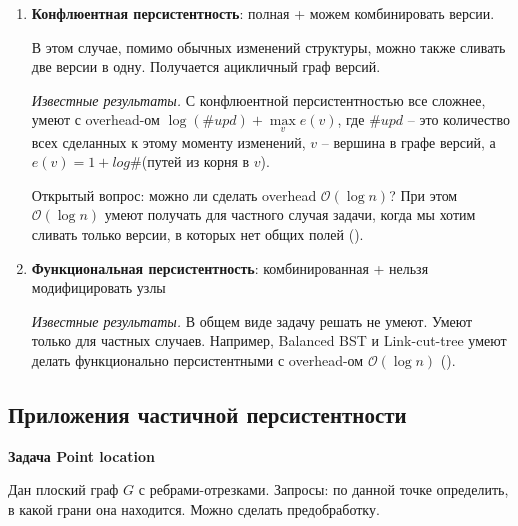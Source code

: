\begin{enumerate}
\item {\bf Конфлюентная персистентность}: полная + можем комбинировать версии.

В этом случае, помимо обычных изменений структуры, можно также сливать две версии в одну. 
Получается ацикличный граф версий.



{\it Известные результаты.} С конфлюентной персистентностью все сложнее, \cite{fiat2003making} умеют с overhead-ом $\log(\#upd) + \max\limits_v e(v)$, 
где $\#upd$ -- это количество всех сделанных к этому моменту изменений, $v$ -- вершина в графе версий, а $e(v) = 1 + log\#$(путей из корня в $v$).

Открытый вопрос: можно ли сделать overhead $\mathcal{O}(\log n)$?
При этом $\mathcal{O}(\log n)$ умеют получать для частного случая задачи, когда мы хотим сливать только версии, в которых нет общих полей (\cite{collette2012confluent}).

\item {\bf Функциональная персистентность}: комбинированная + нельзя модифицировать узлы

{\it Известные результаты.} В общем виде задачу решать не умеют.
Умеют только для частных случаев. Например, Balanced BST и Link-cut-tree умеют делать функционально персистентными с overhead-ом $\mathcal{O}(\log n)$ (\cite{demaine2008confluently}).

\end{enumerate}

\subsection*{Приложения частичной персистентности}

{\bf Задача Point location}

Дан плоский граф $G$ с ребрами-отрезками.
Запросы: по данной точке определить, в какой грани она находится.
Можно сделать предобработку. 


